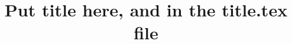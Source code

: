 \documentclass{report}
\begin{document}
%
%






%
%


\title{Put title here, and in the title.tex file}
\end{document}
